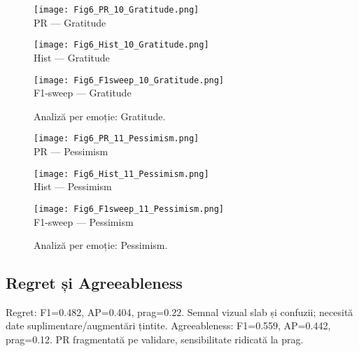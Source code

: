 \begin{figure}[H]
  \centering
  \begin{minipage}[t]{0.32\textwidth}\centering
    \texttt{[image: Fig6\_PR\_10\_Gratitude.png]}\\[-1mm]
    {\scriptsize PR — Gratitude}
  \end{minipage}\hfill
  \begin{minipage}[t]{0.32\textwidth}\centering
    \texttt{[image: Fig6\_Hist\_10\_Gratitude.png]}\\[-1mm]
    {\scriptsize Hist — Gratitude}
  \end{minipage}\hfill
  \begin{minipage}[t]{0.32\textwidth}\centering
    \texttt{[image: Fig6\_F1sweep\_10\_Gratitude.png]}\\[-1mm]
    {\scriptsize F1-sweep — Gratitude}
  \end{minipage}
  \caption{Analiză per emoție: Gratitude.}
  \label{fig:c6-gratitude}
\end{figure}

\begin{figure}[H]
  \centering
  \begin{minipage}[t]{0.32\textwidth}\centering
    \texttt{[image: Fig6\_PR\_11\_Pessimism.png]}\\[-1mm]
    {\scriptsize PR — Pessimism}
  \end{minipage}\hfill
  \begin{minipage}[t]{0.32\textwidth}\centering
    \texttt{[image: Fig6\_Hist\_11\_Pessimism.png]}\\[-1mm]
    {\scriptsize Hist — Pessimism}
  \end{minipage}\hfill
    \begin{minipage}[t]{0.32\textwidth}\centering
    \texttt{[image: Fig6\_F1sweep\_11\_Pessimism.png]}\\[-1mm]
    {\scriptsize F1-sweep — Pessimism}
  \end{minipage}
  \caption{Analiză per emoție: Pessimism.}
  \label{fig:c6-pessimism}
\end{figure}

\subsection{Regret și Agreeableness}
\noindent Regret: F1=0.482, AP=0.404, prag=0.22. Semnal vizual slab și confuzii; necesită date suplimentare/augmentări țintite.
\noindent Agreeableness: F1=0.559, AP=0.442, prag=0.12. PR fragmentată pe validare, sensibilitate ridicată la prag.

